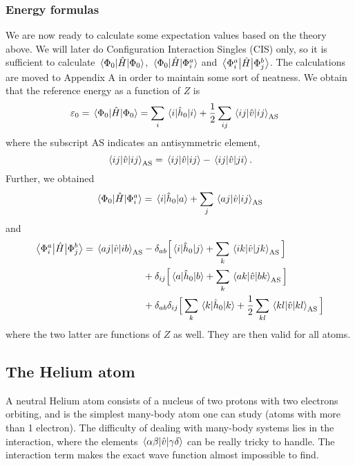 \subsubsection{Energy formulas}
We are now ready to calculate some expectation values based on the theory above. We will later do Configuration Interaction Singles (CIS) only, so it is sufficient to calculate $\mel{\Phi_0}{\hat{H}}{\Phi_0}$, $\mel{\Phi_0}{\hat{H}}{\Phi_i^a}$ and $\mel{\Phi_i^a}{\hat{H}}{\Phi_j^b}$. The calculations are moved to Appendix A in order to maintain some sort of neatness. We obtain that the reference energy as a function
of $Z$ is
\begin{align}
	\varepsilon_0=\mel{\Phi_0}{\hat{H}}{\Phi_0}&=\sum_i\mel{i}{\hat{h}_0}{i}+\frac{1}{2}\sum_{ij}\mel{ij}{\hat{v}}{ij}_{\text{AS}}\label{eq:c_H_c}
\end{align}
where the subscript AS indicates an antisymmetric element,
\begin{equation}
\mel{ij}{\hat{v}}{ij}_{\text{AS}}=\mel{ij}{\hat{v}}{ij}-\mel{ij}{\hat{v}}{ji}.
\end{equation}
Further, we obtained
\begin{equation}
\mel{\Phi_0}{\hat{H}}{\Phi_i^a}=\mel{i}{\hat{h}_0}{a}+\sum_j\mel{aj}{\hat{v}}{ij}_{\text{AS}}
\label{eq:c_H_ia}
\end{equation}
and
\begin{align}
	\mel{\Phi_i^a}{\hat{H}}{\Phi_j^b}=\mel{aj}{\hat{v}}{ib}_{\text{AS}}&-\delta_{ab}\Big[\mel{i}{\hat{h}_0}{j}+\sum_k\mel{ik}{\hat{v}}{jk}_{\text{AS}}\Big]\notag\\
	&+\delta_{ij}\Big[\mel{a}{\hat{h}_0}{b}+\sum_k\mel{ak}{\hat{v}}{bk}_{\text{AS}}\Big]\\
	&+\delta_{ab}\delta_{ij}\Big[\sum_k\mel{k}{\hat{h}_0}{k}+\frac{1}{2}\sum_{kl}\mel{kl}{\hat{v}}{kl}_{\text{AS}}\Big]\notag
	\label{eq:ia_H_jb}
\end{align}
where the two latter are functions of $Z$ as well. They are then valid for all atoms.

\subsection{The Helium atom}
A neutral Helium atom consists of a nucleus of two protons with two electrons orbiting, and is the simplest many-body atom one can study (atoms with more than 1 electron). The difficulty of dealing with many-body systems lies in the interaction, where the elements $\mel{\alpha\beta}{\hat{v}}{\gamma\delta}$ can be really tricky to handle. The interaction term makes the exact wave function almost impossible to find.

